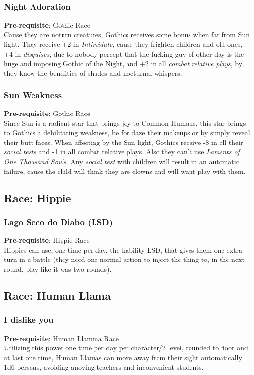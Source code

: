 \documentclass[ letterpaper,12pt]{article}
\begin{document}
{\subsubsection{Night Adoration}
{\bf Pre-requisite}: Gothic Race\\
Cause they are noturn creatures, Gothics receives some bonus when far from Sun light.  They receive +2 in {\it Intimidate}, cause they frighten children and old ones, +4 in {\it disguises}, due to nobody percept that the fucking guy of other day is the huge and imposing Gothic of the Night, and +2 in all {\it combat relative plays}, by they know the benefities of shades and nocturnal whispers.\\

\subsubsection{Sun Weakness}
 {\bf Pre-requisite}: Gothic Race\\
 Since Sun is a radiant star that brings joy to Common Humans, this star brings to Gothics a debilitating weakness, be for daze their makeups or by simply reveal their butt faces. When affecting by the Sun light, Gothics receive -8 in all their {\it social tests} and -1 in all {combat relative plays}. Also they can't use {\it Laments of One Thousand Souls}. Any {\it social test} with children will result in an automatic failure, cause the child will think they are clowns and will want play with them.

\subsection{Race: Hippie}

\subsubsection{Lago Seco do Diabo (LSD)}
{\bf Pre-requisite}: Hippie Race\\
Hippies can use, one time per day, the hability LSD, that gives them one extra turn in a battle (they need one normal action to inject the thing to, in the next round, play like it was two rounds).

\subsection{Race: Human Llama}

\subsubsection{I dislike you}
 {\bf Pre-requisite}: Human Llamma Race\\
Utilizing this power one time per day per character/2 level, rounded to floor and at last one time, Human Llamas can move away from their sight automatically 1d6 persons, avoiding anoying teachers and inconvenient students.

}
\end{document}
